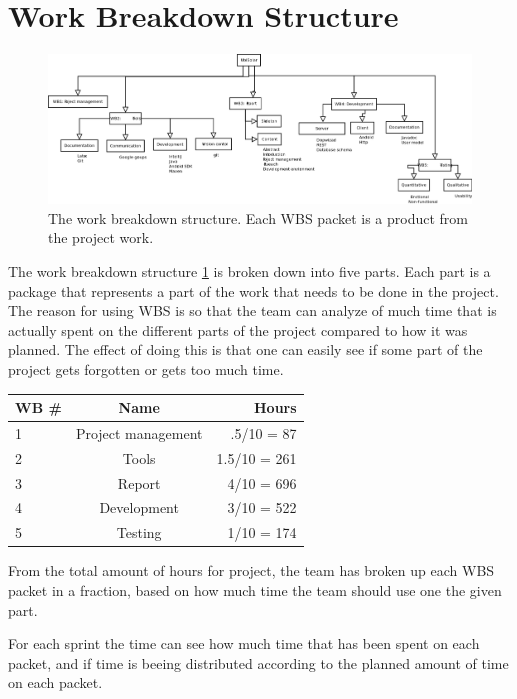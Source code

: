 \section{Work Breakdown Structure}

\begin{figure}[H]
\includegraphics[width=\textwidth]{ch/projectPlan/fig/WBS.png}
\caption{The work breakdown structure. Each WBS packet is a product from the project work.}
\label{fig:wbs}
\end{figure}

The work breakdown structure \ref{fig:wbs} is broken down into five parts. Each part is a package that represents a part of the work that needs to be done in the project.
The reason for using WBS is so that the team can analyze of much time that is actually spent on the different parts of the project compared to how it was planned.
The effect of doing this is that one can easily see if some part of the project gets forgotten or gets too much time.

\begin{table}[H]
\centering
{}
\begin{tabular}{l c r}
    \textbf{WB \#} & \textbf{Name} & \textbf{Hours} \\\hline
    1 & Project management & .5/10 = 87\\\hline
    2 & Tools 			   & 1.5/10 = 261\\\hline
    3 & Report 			   & 4/10 = 696\\\hline
    4 & Development 	   & 3/10 = 522\\\hline
    5 & Testing  		   & 1/10 = 174\\\hline
\end{tabular}
\end{table}

From the total amount of hours for project, the team has broken up each WBS packet in a fraction, based on how much time the team should use one the given part.

For each sprint the time can see how much time that has been spent on each packet, and if time is beeing distributed according to the planned amount of time on each packet.